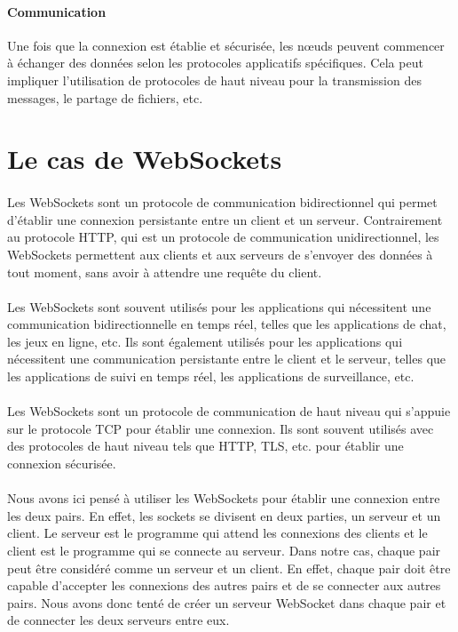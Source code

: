 \paragraph{Communication }
Une fois que la connexion est établie et sécurisée, les nœuds peuvent commencer à échanger des données selon les protocoles applicatifs spécifiques. Cela peut impliquer l'utilisation de protocoles de haut niveau pour la transmission des messages, le partage de fichiers, etc.


\section{Le cas de WebSockets}

\paragraph{}
Les WebSockets sont un protocole de communication bidirectionnel qui permet d'établir une connexion persistante entre un client et un serveur. Contrairement au protocole HTTP, qui est un protocole de communication unidirectionnel, 
les WebSockets permettent aux clients et aux serveurs de s'envoyer des données à tout moment, sans avoir à attendre une requête du client. 

\paragraph{}
Les WebSockets sont souvent utilisés pour les applications qui nécessitent une communication bidirectionnelle en temps réel, telles que les applications de chat, les jeux en ligne, etc. Ils sont également utilisés pour les applications qui nécessitent une communication
persistante entre le client et le serveur, telles que les applications de suivi en temps réel, les applications de surveillance, etc. 

\paragraph{}
Les WebSockets sont un protocole de communication de haut niveau qui s'appuie sur le protocole TCP pour établir une connexion. Ils sont souvent utilisés avec des protocoles de haut niveau tels que HTTP, TLS, etc. pour établir une connexion sécurisée.

\paragraph{}
Nous avons ici pensé à utiliser les WebSockets pour établir une connexion entre les deux pairs. En effet, les sockets se divisent en deux parties, un serveur et un client. Le serveur est le programme qui attend les connexions des clients et le client est le programme qui se connecte au serveur.
Dans notre cas, chaque pair peut être considéré comme un serveur et un client. En effet, chaque pair doit être capable d'accepter les connexions des autres pairs et de se connecter aux autres pairs. Nous avons donc tenté de créer un serveur WebSocket dans chaque pair et de connecter les deux serveurs entre eux.

